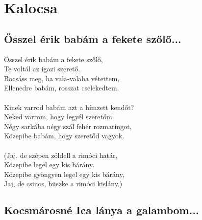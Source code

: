 \chapter{Kalocsa}
\section{Ősszel érik babám a fekete szőlő...}
Ősszel érik babám a fekete szőlő,\\
Te voltál az igazi szerető.\\
Bocsáss meg, ha vala-valaha vétettem,\\
Ellenedre babám, rosszat cselekedtem.\\\\
Kinek varrod babám azt a hímzett kendőt?\\
Neked varrom, hogy legyél szeretőm.\\
Négy sarkába négy szál fehér rozmaringot,\\
Közepibe babám, hogy szeretőd vagyok.\\\\
(Jaj, de szépen zöldell a rimóci határ,\\
Közepibe legel egy kis bárány.\\
Közepibe gyöngyen legel egy kis bárány,\\
Jaj, de csinos, büszke a rimóci kislány.)\\


\section{Kocsmárosné Ica lánya a galambom...}
